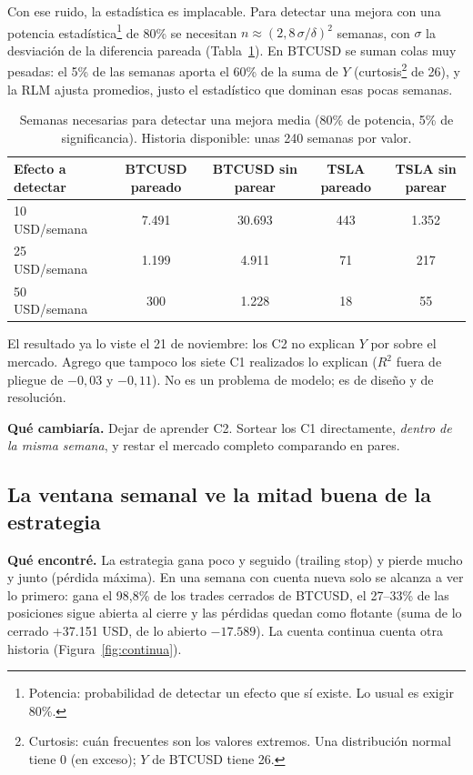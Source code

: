 \documentclass[11pt,a4paper]{article}
\begin{document}
Con ese ruido, la estadística es implacable. Para detectar una mejora con una potencia
estadística\footnote{Potencia: probabilidad de detectar un efecto que sí existe. Lo usual es exigir 80\%.}
de 80\% se necesitan $n \approx (2{,}8\,\sigma/\delta)^2$ semanas, con $\sigma$ la desviación de la
diferencia pareada (Tabla~\ref{tab:potencia}). En BTCUSD se suman colas muy pesadas: el 5\% de las semanas
aporta el 60\% de la suma de $Y$ (curtosis\footnote{Curtosis: cuán frecuentes son los valores extremos.
Una distribución normal tiene 0 (en exceso); $Y$ de BTCUSD tiene 26.} de 26), y la RLM ajusta promedios,
justo el estadístico que dominan esas pocas semanas.

\begin{table}[h]
\centering\small
\begin{tabular}{lcccc}
\toprule
Efecto a detectar & BTCUSD pareado & BTCUSD sin parear & TSLA pareado & TSLA sin parear \\
\midrule
10 USD/semana & 7.491 & 30.693 & 443 & 1.352 \\
25 USD/semana & 1.199 & 4.911 & 71 & 217 \\
50 USD/semana & 300 & 1.228 & 18 & 55 \\
\bottomrule
\end{tabular}
\caption{Semanas necesarias para detectar una mejora media (80\% de potencia, 5\% de significancia).
Historia disponible: unas 240 semanas por valor.}
\label{tab:potencia}
\end{table}

El resultado ya lo viste el 21 de noviembre: los C2 no explican $Y$ por sobre el mercado. Agrego que
tampoco los siete C1 realizados lo explican ($R^2$ fuera de pliegue de $-0{,}03$ y $-0{,}11$). No es un
problema de modelo; es de diseño y de resolución.

\textbf{Qué cambiaría.} Dejar de aprender C2. Sortear los C1 directamente, \emph{dentro de la misma
semana}, y restar el mercado completo comparando en pares.

\subsection{La ventana semanal ve la mitad buena de la estrategia}
\label{sec:mitad}

\textbf{Qué encontré.} La estrategia gana poco y seguido (trailing stop) y pierde mucho y junto (pérdida
máxima). En una semana con cuenta nueva solo se alcanza a ver lo primero: gana el 98,8\% de los trades
cerrados de BTCUSD, el 27--33\% de las posiciones sigue abierta al cierre y las pérdidas quedan como
flotante (suma de lo cerrado +37.151 USD, de lo abierto $-17.589$). La cuenta continua cuenta otra
historia (Figura~\ref{fig:continua}).
\end{document}

